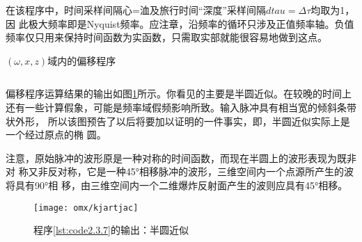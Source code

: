 在该程序中，时间采样间隔心=洫及旅行时间“深度”采样间隔$dtau=\Delta\tau$均取为1，因
此极大频率即是Nyquist频率。应注章，沿频率的循环只涉及正值频率轴。负值频率仅只用来保持时间函数为实函数，只需取实部就能很容易地做到这点。

\begin{listing}[H]
  \caption{$(\omega,x,z)$域内的偏移程序}
  \inputminted{Fortran}{timespace/code2-3-7.f90}
  \label{lst:code2.3.7}
\end{listing}
偏移程序运算结果的输出如图\ref{fig:omx/kjartjac}所示。你看见的主要是半圆近似。在较晚的时间上
还有一些计算假象，可能是频率域假频影响所致。输入脉冲具有相当宽的倾斜条带状外形，
所以该图预告了以后将要加以证明的一件事实，即，半圆近似实际上是一个经过原点的椭
圆。

注意，原始脉冲的波形原是一种对称的时间函数，而现在半圆上的波形表现为既非对
称又非反对称，它是一种45°相移脉冲的波形，三维空间内一个点源所产生的波将具有90°相
移，由三维空间内一个二维爆炸反射面产生的波则应具有45°相移。

\begin{figure}[H]
\centering
\texttt{[image: omx/kjartjac]}
\caption[kjartjac]{程序\ref{lst:code2.3.7}的输出：半圆近似}
\label{fig:omx/kjartjac}
\end{figure}
